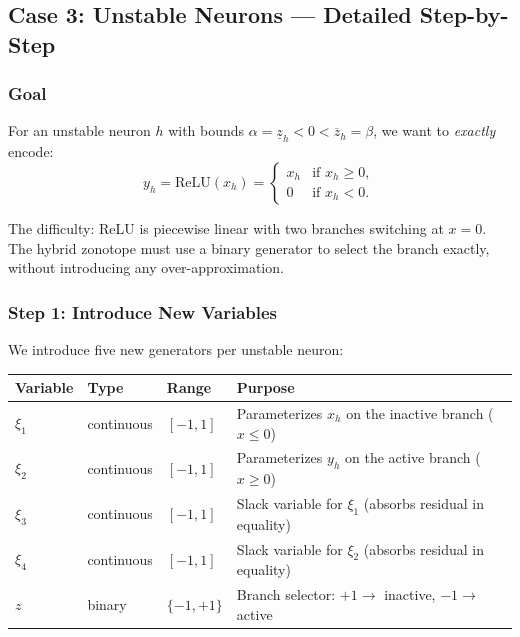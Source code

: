 \documentclass{article}
\begin{document}

\subsection{Case 3: Unstable Neurons --- Detailed Step-by-Step}
\label{sec:relu_case3_detailed}

\subsubsection{Goal}

For an unstable neuron $h$ with bounds $\alpha = \underline{z}_h < 0 < \overline{z}_h = \beta$, we want to \emph{exactly} encode:
\begin{equation}
y_h = \mathrm{ReLU}(x_h) = \begin{cases} x_h & \text{if } x_h \geq 0, \\ 0 & \text{if } x_h < 0. \end{cases}
\end{equation}

The difficulty: ReLU is piecewise linear with two branches switching at $x = 0$. The hybrid zonotope must use a binary generator to select the branch exactly, without introducing any over-approximation.

\subsubsection{Step 1: Introduce New Variables}
\label{sec:step1_vars}


We introduce five new generators per unstable neuron:

\begin{center}
\begin{tabular}{@{}llll@{}}
\toprule
Variable & Type & Range & Purpose \\
\midrule
$\xi_1$ & continuous & $[-1, 1]$ & Parameterizes $x_h$ on the inactive branch ($x \leq 0$) \\
$\xi_2$ & continuous & $[-1, 1]$ & Parameterizes $y_h$ on the active branch ($x \geq 0$) \\
$\xi_3$ & continuous & $[-1, 1]$ & Slack variable for $\xi_1$ (absorbs residual in equality) \\
$\xi_4$ & continuous & $[-1, 1]$ & Slack variable for $\xi_2$ (absorbs residual in equality) \\
$z$     & binary     & $\{-1, +1\}$ & Branch selector: $+1 \to$ inactive, $-1 \to$ active \\
\bottomrule
\end{tabular}
\end{center}
\end{document}
